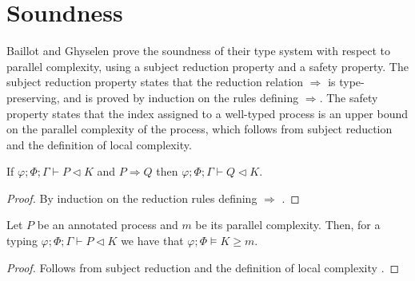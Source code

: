 
\section{Soundness}

Baillot and Ghyselen \cite{BaillotGhyselen2021} prove the soundness of their type system with respect to parallel complexity, using a subject reduction property and a safety property. The subject reduction property states that the reduction relation $\Longrightarrow$ is type-preserving, and is proved by induction on the rules defining $\Longrightarrow$. The safety property states that the index assigned to a well-typed process is an upper bound on the parallel complexity of the process, which follows from subject reduction and the definition of local complexity.

\begin{theorem}
If $\varphi;\Phi;\Gamma\vdash P \triangleleft K$ and $P \Rightarrow Q$ then $\varphi;\Phi;\Gamma\vdash Q \triangleleft K$.
\begin{proof}
By induction on the reduction rules defining $\Longrightarrow$ \cite{BaillotGhyselen2021}.
\end{proof}
\end{theorem}
%

%
\begin{theorem}
Let $P$ be an annotated process and $m$ be its parallel complexity. Then, for a typing $\varphi;\Phi;\Gamma\vdash P \triangleleft K$ we have that $\varphi;\Phi\vDash K \geq m$.
\begin{proof}
Follows from subject reduction and the definition of local complexity \cite{BaillotGhyselen2021}. 
\end{proof}
\end{theorem}